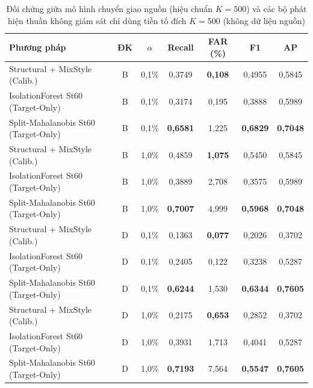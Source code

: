 \documentclass[12pt, a4paper, reqno, oneside]{book}
\begin{document}
\begin{table}[htbp]
  \centering
  \caption[Đối chứng giữa mô hình chuyển giao nguồn và bộ phát hiện thuần xe đích]{Đối chứng giữa mô hình chuyển giao nguồn (hiệu chuẩn $K=500$) và các bộ phát hiện thuần không giám sát chỉ dùng tiền tố đích $K=500$ (không dữ liệu nguồn)}
  \label{tab:target-only}
  \footnotesize
  \begin{tabular}{@{}l c c c c c c@{}}
    \toprule
    \textbf{Phương pháp} & \textbf{ĐK} & $\alpha$ & \textbf{Recall} & \textbf{FAR (\%)} & \textbf{F1} & \textbf{AP} \\
    \midrule
    Structural + MixStyle (Calib.) & B & 0,1\% & 0,3749 & \textbf{0,108} & 0,4955 & 0,5845 \\
    IsolationForest St60 (Target-Only) & B & 0,1\% & 0,3174 & 0,195 & 0,3888 & 0,5989 \\
    Split-Mahalanobis St60 (Target-Only) & B & 0,1\% & \textbf{0,6581} & 1,225 & \textbf{0,6829} & \textbf{0,7048} \\
    \midrule
    Structural + MixStyle (Calib.) & B & 1,0\% & 0,4859 & \textbf{1,075} & 0,5450 & 0,5845 \\
    IsolationForest St60 (Target-Only) & B & 1,0\% & 0,3889 & 2,708 & 0,3575 & 0,5989 \\
    Split-Mahalanobis St60 (Target-Only) & B & 1,0\% & \textbf{0,7007} & 4,999 & \textbf{0,5968} & \textbf{0,7048} \\
    \midrule
    Structural + MixStyle (Calib.) & D & 0,1\% & 0,1363 & \textbf{0,077} & 0,2026 & 0,3702 \\
    IsolationForest St60 (Target-Only) & D & 0,1\% & 0,2405 & 0,122 & 0,3238 & 0,5287 \\
    Split-Mahalanobis St60 (Target-Only) & D & 0,1\% & \textbf{0,6244} & 1,530 & \textbf{0,6344} & \textbf{0,7605} \\
    \midrule
    Structural + MixStyle (Calib.) & D & 1,0\% & 0,2175 & \textbf{0,653} & 0,2852 & 0,3702 \\
    IsolationForest St60 (Target-Only) & D & 1,0\% & 0,3931 & 1,713 & 0,4041 & 0,5287 \\
    Split-Mahalanobis St60 (Target-Only) & D & 1,0\% & \textbf{0,7193} & 7,564 & \textbf{0,5547} & \textbf{0,7605} \\
    \bottomrule
  \end{tabular}
\end{table}
\end{document}
